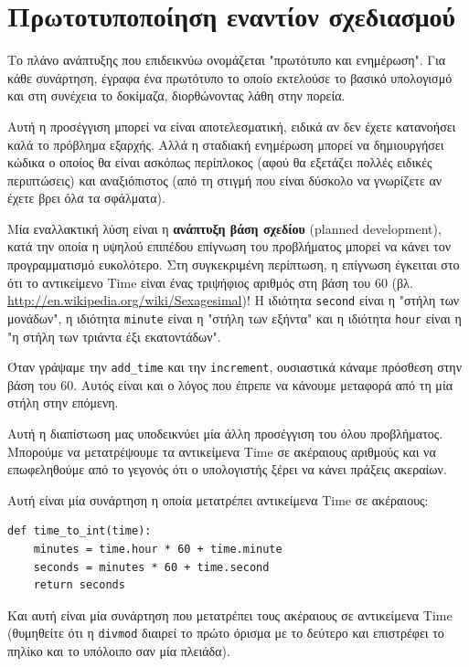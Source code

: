 \documentclass[10pt]{book}
\begin{document}
\section{Πρωτοτυποποίηση εναντίον σχεδιασμού}
\label{prototype}

Το πλάνο ανάπτυξης που επιδεικνύω ονομάζεται "πρωτότυπο και ενημέρωση". Για κάθε συνάρτηση, έγραφα ένα
πρωτότυπο το οποίο εκτελούσε το βασικό υπολογισμό και στη συνέχεια το δοκίμαζα, διορθώνοντας λάθη στην πορεία.

Αυτή η προσέγγιση μπορεί να είναι αποτελεσματική, ειδικά αν δεν έχετε κατανοήσει καλά το πρόβλημα εξαρχής.
Αλλά η σταδιακή ενημέρωση μπορεί να δημιουργήσει κώδικα ο οποίος θα είναι ασκόπως περίπλοκος (αφού θα εξετάζει
πολλές ειδικές περιπτώσεις) και αναξιόπιστος (από τη στιγμή που είναι δύσκολο να γνωρίζετε αν έχετε βρει
όλα τα σφάλματα).

Μία εναλλακτική λύση είναι η {\bf ανάπτυξη βάση σχεδίου} (planned development), κατά την οποία η υψηλού
επιπέδου επίγνωση του προβλήματος μπορεί να κάνει τον προγραμματισμό ευκολότερο. Στη συγκεκριμένη περίπτωση,
η επίγνωση έγκειται στο ότι το αντικείμενο Time είναι ένας τριψήφιος αριθμός στη βάση του 60 (βλ. \url{http://en.wikipedia.org/wiki/Sexagesimal})! Η ιδιότητα {\tt second} είναι η "στήλη των μονάδων", η ιδιότητα {\tt minute} είναι η "στήλη των εξήντα" και η ιδιότητα {\tt hour} είναι η "η στήλη των τριάντα έξι εκατοντάδων". 

Όταν γράψαμε την \verb"add_time" και την {\tt increment}, ουσιαστικά κάναμε πρόσθεση στην βάση του 60.
Αυτός είναι και ο λόγος που έπρεπε να κάνουμε μεταφορά από τη μία στήλη στην επόμενη. 

Αυτή η διαπίστωση μας υποδεικνύει μία άλλη προσέγγιση του όλου προβλήματος.  Μπορούμε να μετατρέψουμε τα αντικείμενα  Time  σε ακέραιους αριθμούς και να επωφεληθούμε από το γεγονός ότι ο υπολογιστής ξέρει να κάνει πράξεις ακεραίων.

Αυτή είναι μία συνάρτηση η οποία μετατρέπει αντικείμενα Time σε ακέραιους:

\begin{verbatim}
def time_to_int(time):
    minutes = time.hour * 60 + time.minute
    seconds = minutes * 60 + time.second
    return seconds
\end{verbatim}
%
Και αυτή είναι μία συνάρτηση που μετατρέπει τους ακέραιους σε αντικείμενα Time (θυμηθείτε ότι η {\tt divmod}
διαιρεί το πρώτο όρισμα με το δεύτερο και επιστρέφει το πηλίκο και το υπόλοιπο σαν μία πλειάδα). 
\end{document}
